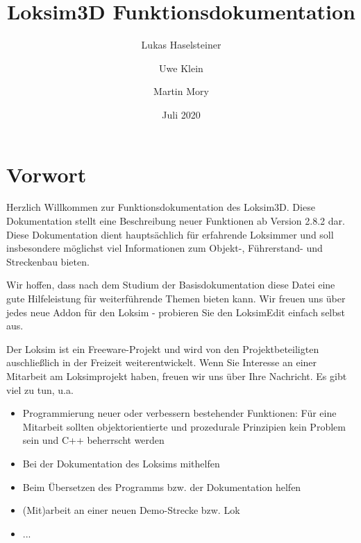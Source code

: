 \documentclass[11pt, a4paper]{refrep}
\begin{document}
\author{Lukas Haselsteiner \and Uwe Klein \and Martin Mory} 
\title{Loksim3D Funktionsdokumentation} 
\date{Juli 2020} 

\maketitle


\chapter{Vorwort}
Herzlich Willkommen zur Funktionsdokumentation des Loksim3D. Diese
Dokumentation stellt eine Beschreibung neuer Funktionen ab
Version 2.8.2 dar. Diese Dokumentation dient hauptsächlich für erfahrende Loksimmer 
und soll insbesondere möglichst viel Informationen zum
Objekt-, Führerstand- und Streckenbau bieten.

Wir hoffen, dass nach dem Studium der Basisdokumentation diese Datei
eine gute Hilfeleistung für weiterführende Themen bieten kann. Wir
freuen uns über jedes neue Addon für den Loksim - probieren Sie den
LoksimEdit einfach selbst aus.

Der Loksim ist ein Freeware-Projekt und wird von den Projektbeteiligten
auschließlich in der Freizeit weiterentwickelt. Wenn Sie Interesse an
einer Mitarbeit am Loksimprojekt haben, freuen wir uns über Ihre
Nachricht. Es gibt viel zu tun, u.a.

\begin{itemize}
\item
  Programmierung neuer oder verbessern bestehender Funktionen: 
  Für eine Mitarbeit sollten objektorientierte und prozedurale 
  Prinzipien kein Problem sein und C++ beherrscht werden
\item
  Bei der Dokumentation des Loksims mithelfen
\item
  Beim Übersetzen des Programms bzw. der Dokumentation helfen
\item 
  (Mit)arbeit an einer neuen Demo-Strecke bzw. Lok
\item ...
\end{itemize}

\clearpage

\tableofcontents 

\clearpage


\end{document}
